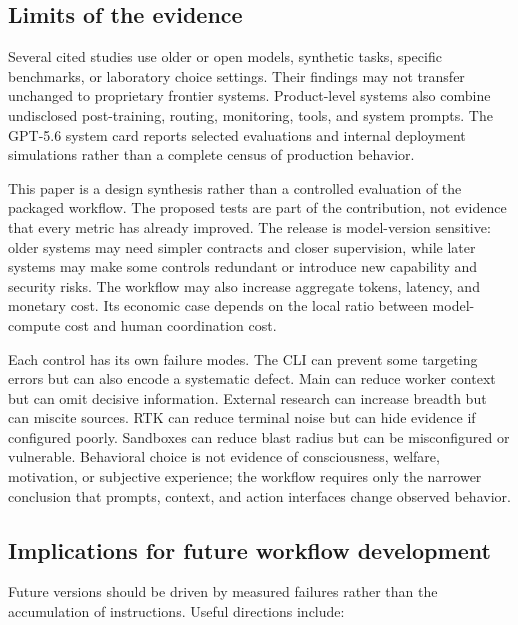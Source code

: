 \documentclass[11pt,a4paper]{article}
\begin{document}
\subsection{Limits of the evidence}\label{sec:evidence-limits}

Several cited studies use older or open models, synthetic tasks, specific benchmarks, or laboratory choice settings. Their findings may not transfer unchanged to proprietary frontier systems. Product-level systems also combine undisclosed post-training, routing, monitoring, tools, and system prompts. The GPT-5.6 system card reports selected evaluations and internal deployment simulations rather than a complete census of production behavior.

This paper is a design synthesis rather than a controlled evaluation of the packaged workflow. The proposed tests are part of the contribution, not evidence that every metric has already improved. The release is model-version sensitive: older systems may need simpler contracts and closer supervision, while later systems may make some controls redundant or introduce new capability and security risks. The workflow may also increase aggregate tokens, latency, and monetary cost. Its economic case depends on the local ratio between model-compute cost and human coordination cost.

Each control has its own failure modes. The CLI can prevent some targeting errors but can also encode a systematic defect. Main can reduce worker context but can omit decisive information. External research can increase breadth but can miscite sources. RTK can reduce terminal noise but can hide evidence if configured poorly. Sandboxes can reduce blast radius but can be misconfigured or vulnerable. Behavioral choice is not evidence of consciousness, welfare, motivation, or subjective experience; the workflow requires only the narrower conclusion that prompts, context, and action interfaces change observed behavior.

\subsection{Implications for future workflow development}\label{sec:future-work}

Future versions should be driven by measured failures rather than the accumulation of instructions. Useful directions include:
\end{document}
